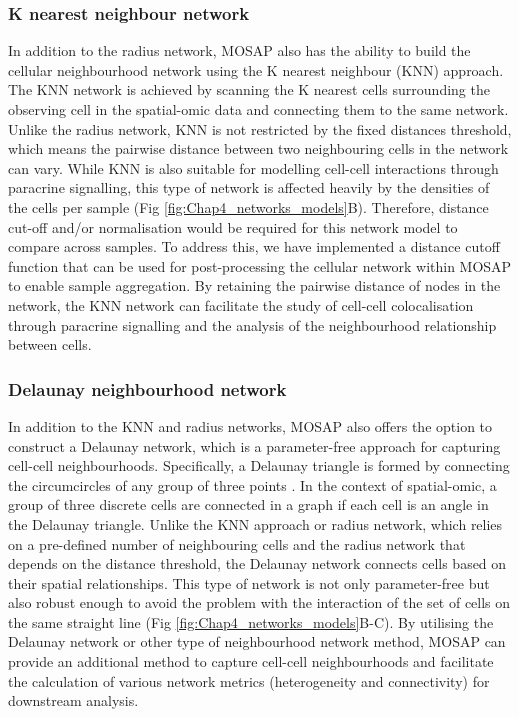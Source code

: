 \subsubsection{K nearest neighbour network}
In addition to the radius network, MOSAP also has the ability to build the cellular neighbourhood network using the K nearest neighbour (KNN) approach. The KNN network is achieved by scanning the K nearest cells surrounding the observing cell in the spatial-omic data and connecting them to the same network. Unlike the radius network, KNN is not restricted by the fixed distances threshold, which means the pairwise distance between two neighbouring cells in the network can vary. While KNN is also suitable for modelling cell-cell interactions through paracrine signalling, this type of network is affected heavily by the densities of the cells per sample (Fig \ref{fig:Chap4_networks_models}B). Therefore, distance cut-off and/or normalisation would be required for this network model to compare across samples. To address this, we have implemented a distance cutoff function that can be used for post-processing the cellular network within MOSAP to enable sample aggregation. By retaining the pairwise distance of nodes in the network, the KNN network can facilitate the study of cell-cell colocalisation through paracrine signalling and the analysis of the neighbourhood relationship between cells.

\subsubsection{Delaunay neighbourhood network}
In addition to the KNN and radius networks, MOSAP also offers the option to construct a Delaunay network, which is a parameter-free approach for capturing cell-cell neighbourhoods. Specifically, a Delaunay triangle is formed by connecting the circumcircles of any group of three points \cite{fortune1995voronoi}. In the context of spatial-omic, a group of three discrete cells are connected in a graph if each cell is an angle in the Delaunay triangle. Unlike the KNN approach or radius network, which relies on a pre-defined number of neighbouring cells and the radius network that depends on the distance threshold, the Delaunay network connects cells based on their spatial relationships. This type of network is not only parameter-free but also robust enough to avoid the problem with the interaction of the set of cells on the same straight line (Fig \ref{fig:Chap4_networks_models}B-C). By utilising the Delaunay network or other type of neighbourhood network method, MOSAP can provide an additional method to capture cell-cell neighbourhoods and facilitate the calculation of various network metrics (\ie heterogeneity and connectivity) for downstream analysis.   

